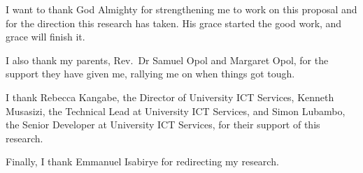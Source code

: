 I want to thank God Almighty for strengthening me to work on this proposal and for the direction this research has taken. His grace started the good work, and grace will finish it.

I also thank my parents, Rev.\ Dr Samuel Opol and Margaret Opol, for the support they have given me, rallying me on when things got tough.

I thank Rebecca Kangabe, the Director of University ICT Services, Kenneth Musasizi, the Technical Lead at University ICT Services, and Simon Lubambo, the Senior Developer at University ICT Services, for their support of this research.

Finally, I thank Emmanuel Isabirye for redirecting my research.
